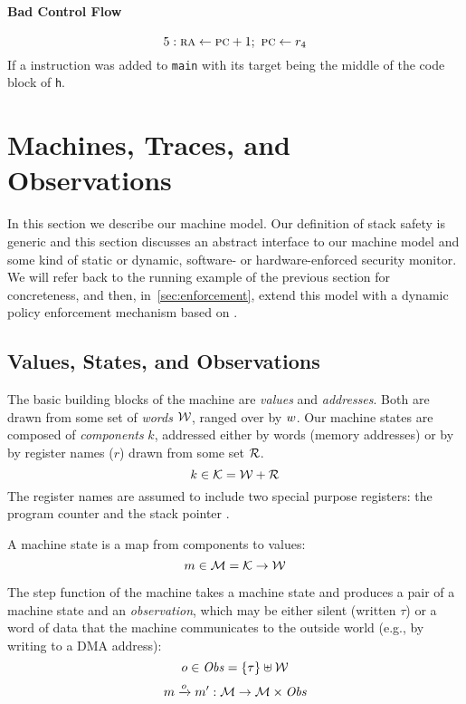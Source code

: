 \documentclass[acmsmall,review,anonymous]{acmart}\settopmatter{printfolios=true,printccs=false,printacmref=false}
\begin{document}
\paragraph*{Bad Control Flow}

\[
5  : \textsc{ra} \leftarrow \textsc{pc} + 1 ; ~ \textsc{pc} \leftarrow r_4
\]
If a {\jalr} instruction was added to {\tt main} with its target being
the middle of the code block of {\tt h}.

\section{Machines, Traces, and Observations}
\label{sec:prelim}

In this section we describe our machine model. Our definition of stack
safety is generic and this section discusses an abstract interface to
our machine model and some kind of static or dynamic, software- or
hardware-enforced security monitor. We will refer back to the running
example of the previous section for concreteness, and then,
in~\cref{sec:enforcement}, extend this model with a dynamic policy
enforcement mechanism based on
\citet{DBLP:conf/sp/RoesslerD18}.

\subsection{Values, States, and Observations}

The basic building blocks of the machine are {\em values} and {\em
  addresses}. Both are drawn from some set of {\em words}
${\mathcal W}$, ranged over by $w$.
%
Our machine states are composed of {\em components} $k$, addressed either by
words (memory addresses) or by by register names ($r$) drawn from some set
${\mathcal R}$.
%
    \[k \in {\mathcal K} = {\mathcal W} + {\mathcal R} \]
%
The register names are assumed to include two special purpose registers: the
program counter {\PCname} and the stack pointer \SP.

A machine state is a map from components to values:
%
\[m \in {\mathcal M} = {\mathcal K} \rightarrow {\mathcal W}\]

The step function of the machine takes a machine state and produces a
pair of a machine state and an {\em observation}, which may be either
silent (written $\tau$) or a word of data that the machine
communicates to the outside world (e.g., by writing to a DMA
address):
%
\[o \in \mathit{Obs} = \{\tau\} \uplus {\mathcal W}\]
\[m \xrightarrow{o} m' : {\mathcal M} \rightarrow {\mathcal M} \times \mathit{Obs} \]
%
\end{document}

